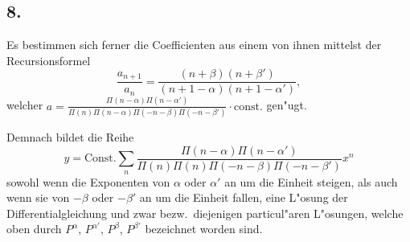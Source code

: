 \documentclass[12pt,a4paper]{article}
\begin{document}
\subsection*{8.}

Es bestimmen sich ferner die Coefficienten aus einem von ihnen mittelst der Recursionsformel
\[
\frac{a_{n+1}}{a_n} = \frac{(n + \beta)(n + \beta')}{(n + 1 - \alpha)(n + 1 - \alpha')},
\]
welcher $a = \frac{\Pi(n - \alpha) \Pi(n - \alpha')}{\Pi(n) \Pi(n - \alpha) \Pi(-n - \beta) \Pi(-n - \beta')} \cdot \text{const.}$ gen{"u}gt.

Demnach bildet die Reihe
\[
y = \text{Const.} \sum_n \frac{\Pi(n - \alpha) \Pi(n - \alpha')}{\Pi(n) \Pi(n) \Pi(-n - \beta) \Pi(-n - \beta')} x^n
\]
sowohl wenn die Exponenten von $\alpha$ oder $\alpha'$ an um die Einheit steigen, als auch wenn sie von $-\beta$ oder $-\beta'$ an um die Einheit fallen, eine L{"o}sung der Differentialgleichung und zwar bezw.\ diejenigen particul{"a}ren L{"o}sungen, welche oben durch $P^{\alpha}$, $P^{\alpha'}$, $P^{\beta}$, $P^{\beta'}$ bezeichnet worden sind.
\end{document}
